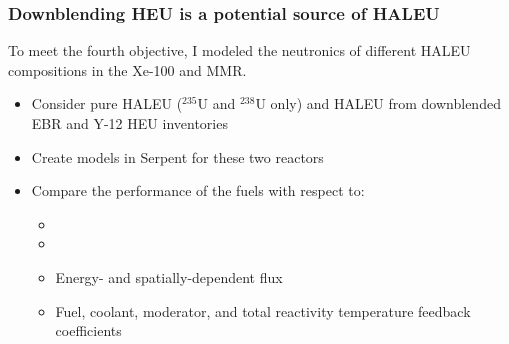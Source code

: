 \begin{frame}
    \frametitle{Downblending HEU is a potential source of HALEU}
    To meet the fourth objective, I modeled the neutronics of 
    different HALEU compositions in the Xe-100 and MMR.
    \begin{itemize}
        \item Consider pure HALEU ($^{235}$U and $^{238}$U only)
              and HALEU from downblended \gls{EBR} 
              \cite{vaden_isotopic_2018} and Y-12 
              \cite{nelson_foreign_2010}  \gls{HEU} inventories
        \item Create models in Serpent \cite{leppanen_serpent_2013} 
              for these two reactors
        \item Compare the performance of the fuels with respect to:
        \begin{itemize}
            \item \keff
            \item \betaEff
            \item Energy- and spatially-dependent flux
            \item Fuel, coolant, moderator, and total reactivity
                  temperature feedback coefficients
        \end{itemize}
    \end{itemize}

\end{frame}


